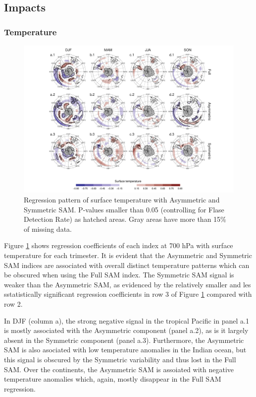 \documentclass[]{ametsocV5}
\begin{document}
\subsection{Impacts}

\subsubsection{Temperature}

\begin{figure}
\includegraphics{regr-air-season-1} \caption[Regression pattern of surface temperature with Asymmetric and Symmetric SAM]{Regression pattern of surface temperature with Asymmetric and Symmetric SAM. P-values smaller than 0.05 (controlling for Flase Detection Rate) as hatched areas. Gray areas have more than 15\% of missing data.}\label{fig:regr-air-season}
\end{figure}

Figure \ref{fig:regr-air-season} shows regression coefficients of each
index at 700 hPa with surface temperature for each trimester. It is
evident that the Asymmetric and Symmetric SAM indices are associated
with overall distinct temperature patterns which can be obscured when
using the Full SAM index. The Symmetric SAM signal is weaker than the
Asymmetric SAM, as evidenced by the relatively smaller and les
sstatistically significant regression coefficients in row 3 of Figure
\ref{fig:regr-air-season} compared with row 2.

In DJF (column a), the strong negative signal in the tropical Pacific in
panel a.1 is mostly associated with the Asymmetric component (panel
a.2), as is it largely absent in the Symmetric component (panel a.3).
Furthermore, the Asymmetric SAM is also asociated with low temperature
anomalies in the Indian ocean, but this signal is obscured by the
Symmetric variability and thus lost in the Full SAM. Over the
continents, the Asymmetric SAM is assoiated with negative temperature
anomalies which, again, mostly disappear in the Full SAM regression.
\end{document}
